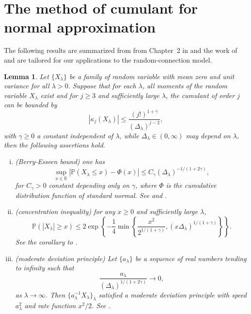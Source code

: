 \documentclass[12pt]{article}
\newcommand{\R}{\mathbb{R}}
\newcommand{\IP}{\mathbb{P}}
\newtheorem{lemma}[prop]{Lemma}
\numberwithin{equation}{section}
\begin{document}
\section{The method of cumulant for normal approximation}
\label{statuleviciuscond}
\noindent
The following results are summarized from from Chapter~2 in \cite{saulis} and the work of \cite{doring} and are tailored for our applications to the random-connection model.
\begin{lemma}\label{Statuleviciuscond1}
Let $\{X_\lambda\}$ be a family of random variable with mean zero and unit variance for all $\lambda>0$. Suppose that for each $\lambda$, all moments of the random variable $X_\lambda$ exist and for $j\geq 3$ and sufficiently large $\lambda$, the cumulant of order $j$ can be bounded by
\begin{equation}
  \label{Statuleviciuscond2}
|\kappa_j(X_\lambda)|\leq \frac{(j!)^{1+\gamma}}{(\Delta_\lambda)^{j-2}},
\end{equation}
with $\gamma\ge0$ a constant independent of $\lambda$, while $\Delta_\lambda\in(0,\infty)$ may depend on $\lambda$, then the following assertions hold.
\begin{enumerate}[i.]
\item (Berry-Esseen bound) {\rm one has
\begin{equation}
\nonumber
  \sup_{x\in\R}|\IP(X_\lambda\leq x)-\Phi(x)|\leq C_\gamma (\Delta_\lambda)^{-1/(1+2\gamma)},
\end{equation}
 for $C_\gamma>0$ constant depending only on $\gamma$,
where $\Phi$ is the cumulative distribution function of standard normal. See \cite[Corollary~2.1]{saulis} and \cite[Theorem~2.4]{doering}.}
\item (concentration inequality) {\rm for any $x\ge0$ and sufficiently large $\lambda$, 
\begin{equation}
\nonumber
  \IP(|X_\lambda|\geq x)\le2\exp\left\{-\frac14\min\left\{\frac{x^2}{2^{1/(1+\gamma)}},(x\Delta_\lambda)^{1/(1+\gamma)}\right\}\right\}.
\end{equation} See the corollary to \cite[Lemma~2.4]{saulis}.}
\item (moderate deviation principle) {\rm Let $\{a_\lambda\}$ be a sequence of real numbers tending to infinity such that 
$$\frac{a_\lambda}{(\Delta_\lambda)^{1/(1+2\gamma)}}\to0,$$ as $\lambda\to\infty$. Then $\{a_\lambda^{-1} X_\lambda\}_\lambda$ satisfied a moderate deviation principle with speed $a_\lambda^2$ and rate function $x^2/2$. See \cite[Theorem~1.1]{doring}.}

\end{enumerate}
\end{lemma}
\end{document}
